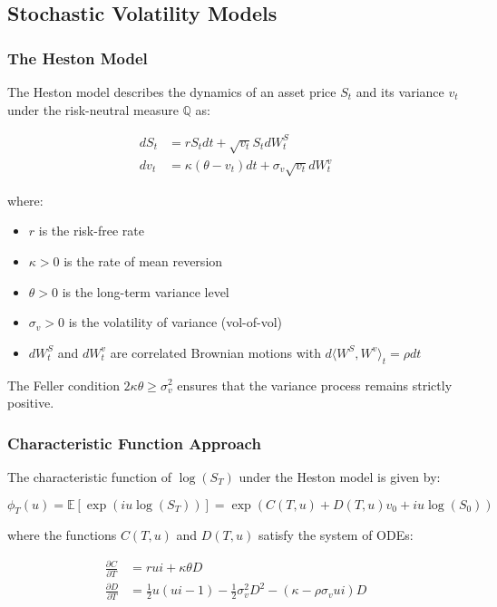 \documentclass[12pt,a4paper]{article}
\begin{document}
\subsection{Stochastic Volatility Models}

\subsubsection{The Heston Model}

The Heston model \citep{heston1993closed} describes the dynamics of an asset price $S_t$ and its variance $v_t$ under the risk-neutral measure $\mathbb{Q}$ as:

\begin{align}
dS_t &= rS_t dt + \sqrt{v_t}S_t dW_t^S \label{eq:heston_price} \\
dv_t &= \kappa(\theta - v_t)dt + \sigma_v\sqrt{v_t}dW_t^v \label{eq:heston_var}
\end{align}

where:
\begin{itemize}
    \item $r$ is the risk-free rate
    \item $\kappa > 0$ is the rate of mean reversion
    \item $\theta > 0$ is the long-term variance level
    \item $\sigma_v > 0$ is the volatility of variance (vol-of-vol)
    \item $dW_t^S$ and $dW_t^v$ are correlated Brownian motions with $d\langle W^S, W^v \rangle_t = \rho dt$
\end{itemize}

The Feller condition $2\kappa\theta \geq \sigma_v^2$ ensures that the variance process remains strictly positive.

\subsubsection{Characteristic Function Approach}

The characteristic function of $\log(S_T)$ under the Heston model is given by:

\begin{equation}
\phi_T(u) = \mathbb{E}[\exp(iu\log(S_T))] = \exp(C(T,u) + D(T,u)v_0 + iu\log(S_0))
\end{equation}

where the functions $C(T,u)$ and $D(T,u)$ satisfy the system of ODEs:

\begin{align}
\frac{\partial C}{\partial T} &= ru i + \kappa\theta D \\
\frac{\partial D}{\partial T} &= \frac{1}{2}u(ui - 1) - \frac{1}{2}\sigma_v^2 D^2 - (\kappa - \rho\sigma_v ui)D
\end{align}
\end{document}
